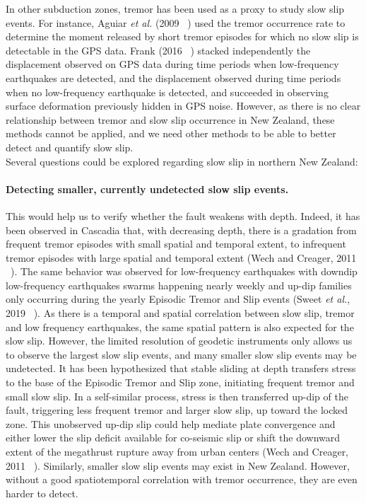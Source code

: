 \documentclass[letterpaper, 12pt]{article}
\begin{document}
In other subduction zones, tremor has been used as a proxy to study slow slip events. For instance, Aguiar \textit{et al.} (2009 ~\cite{AGU_2009}) used the tremor occurrence rate to determine the moment released by short tremor episodes for which no slow slip is detectable in the GPS data. Frank (2016 ~\cite{FRA_2016}) stacked independently the displacement observed on GPS data during time periods when low-frequency earthquakes are detected, and the displacement observed during time periods when no low-frequency earthquake is detected, and succeeded in observing surface deformation previously hidden in GPS noise. However, as there is no clear relationship between tremor and slow slip occurrence in New Zealand, these methods cannot be applied, and we need other methods to be able to better detect and quantify slow slip.\\

Several questions could be explored regarding slow slip in northern New Zealand:

\paragraph{Detecting smaller, currently undetected slow slip events.} This would help us to verify whether the fault weakens with depth. Indeed, it has been observed in Cascadia that, with decreasing depth, there is a gradation from frequent tremor episodes with small spatial and temporal extent, to infrequent tremor episodes with large spatial and temporal extent (Wech and Creager, 2011 ~\cite{WEC_2011}). The same behavior was observed for low-frequency earthquakes with downdip low-frequency earthquakes swarms happening nearly weekly and up-dip families only occurring during the yearly Episodic Tremor and Slip events (Sweet \textit{et al.}, 2019 ~\cite{SWE_2019}). As there is a temporal and spatial correlation between slow slip, tremor and low frequency earthquakes, the same spatial pattern is also expected for the slow slip. However, the limited resolution of geodetic instruments only allows us to observe the largest slow slip events, and many smaller slow slip events may be undetected. It has been hypothesized that stable sliding at depth transfers stress to the base of the Episodic Tremor and Slip zone, initiating frequent tremor and small slow slip. In a self-similar process, stress is then transferred up-dip of the fault, triggering less frequent tremor and larger slow slip, up toward the locked zone. This unobserved up-dip slip could help mediate plate convergence and either lower the slip deficit available for co-seismic slip or shift the downward extent of the megathrust rupture away from urban centers (Wech and Creager, 2011 ~\cite{WEC_2011}). Similarly, smaller slow slip events may exist in New Zealand. However, without a good spatiotemporal correlation with tremor occurrence, they are even harder to detect.
\end{document}
